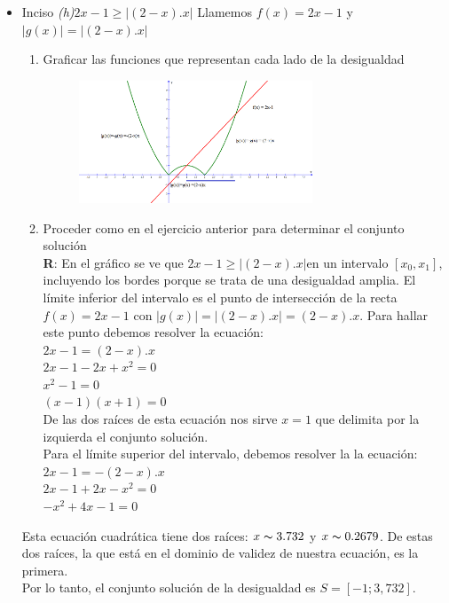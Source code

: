 \documentclass[12pt]{article}
\theoremstyle{definition}
\begin{document}
\begin{enumerate}
\begin{itemize}
\item Inciso \textit{(h)}$ 2x-1 \geq |(2-x).x|$
           Llamemos $f(x) =  2x-1$ y $|g(x)| = |(2-x).x| $
	\begin{enumerate}
	\item Graficar las funciones que representan cada lado de la desigualdad
	\begin{figure}[H]
	\centering
	\includegraphics[width=0.7\textwidth]{31-4.png}
	\end{figure}
	\item Proceder como en el ejercicio anterior para determinar el conjunto solución\\
	\textbf{R}: En el gráfico se ve que $ 2x-1 \geq |(2-x).x|$en un intervalo $[x_0,x_1]$, incluyendo los bordes porque se 			trata de una desigualdad amplia. 
	El límite inferior del intervalo es el punto de intersección de la recta $f(x) =2x-1$ con  $|g(x)| = |(2-x).x| = (2-x).x$. Para hallar este punto debemos resolver la ecuación: \\
	$2x-1= (2-x).x $\\
	$2x-1-2x+x^{2}=0 $\\
	$x^{2}-1=0$\\
	$(x-1)(x+1)=0$\\
	De las dos raíces de esta ecuación nos sirve $x=1$ que delimita por la izquierda el conjunto solución.\\
	Para el límite superior del intervalo, debemos resolver la  la ecuación: \\
	$2x-1= -(2-x).x $\\
	$2x-1+2x-x^{2}=0 $\\
	$-x^{2}+4x-1=0$\\
	\end{enumerate}
	Esta ecuación cuadrática tiene dos raíces: $x \thicksim 3.732$ y  $x \thicksim 0.2679$. De estas dos raíces, la que está en el dominio de validez de nuestra ecuación, es la primera.\\
 Por lo tanto, el conjunto solución de la desigualdad es $S = [-1;3,732]$.

\end{itemize}

\end{enumerate}
\end{document}
